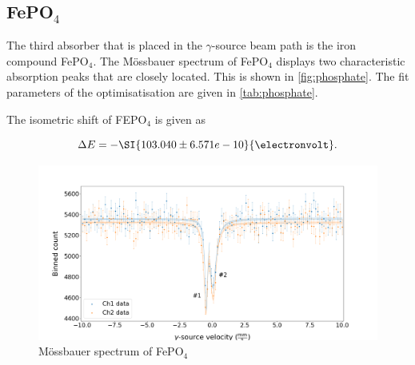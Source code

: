 
\subsection{FePO$_4$}
\label{ssec:phosphate}

The third absorber that is placed in the $\gamma$-source beam path is the iron
compound FePO$_4$. The Mössbauer spectrum of FePO$_4$ displays two characteristic
absorption peaks that are closely located. This is shown in \autoref{fig:phosphate}.
The fit parameters of the optimisatisation are given in \autoref{tab:phosphate}.

The isometric shift of FEPO$_4$ is given as

\begin{equation}
\Delta E = -\SI{103.040\pm6.571e-10}{\electronvolt}.
\end{equation}




\begin{figure}
	\label{fig:phosphate}
	\includegraphics[width=1.0\textwidth]{./fig/Phosphate.png}
	\caption{Mössbauer spectrum of FePO$_4$}{}
\end{figure}


